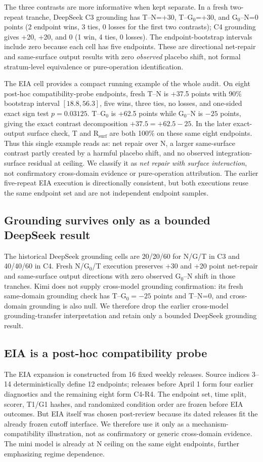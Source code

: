 The three contrasts are more informative when kept separate. In a fresh two-repeat tranche, DeepSeek C3 grounding has T--N=+30, T--G$_0$=+30, and G$_0$--N=0 points (2 endpoint wins, 3 ties, 0 losses for the first two contrasts); C4 grounding gives +20, +20, and 0 (1 win, 4 ties, 0 losses). The endpoint-bootstrap intervals include zero because each cell has five endpoints. These are directional net-repair and same-surface output results with zero \emph{observed} placebo shift, not formal stratum-level equivalence or pure-operation identification.

The EIA cell provides a compact running example of the whole audit. On eight post-hoc compatibility-probe endpoints, fresh T--N is +37.5 points with 90\% bootstrap interval $[18.8,56.3]$, five wins, three ties, no losses, and one-sided exact sign test $p=0.03125$. T--G$_0$ is +62.5 points while G$_0$--N is $-25$ points, giving the exact contrast decomposition $+37.5=+62.5-25$. In the later exact-output surface check, T and R$_{\mathrm{surf}}$ are both 100\% on these same eight endpoints. Thus this single example reads as: net repair over N, a larger same-surface contrast partly created by a harmful placebo shift, and no observed integration-surface residual at ceiling. We classify it as \emph{net repair with surface interaction}, not confirmatory cross-domain evidence or pure-operation attribution. The earlier five-repeat EIA execution is directionally consistent, but both executions reuse the same endpoint set and are not independent endpoint samples.

\subsection{Grounding survives only as a bounded DeepSeek result}
The historical DeepSeek grounding cells are 20/20/60 for N/G/T in C3 and 40/40/60 in C4. Fresh N/G$_0$/T execution preserves +30 and +20 point net-repair and same-surface output directions with zero observed G$_0$--N shift in those tranches. Kimi does not supply cross-model grounding confirmation: its fresh same-domain grounding check has T--G$_0=-25$ points and T--N=0, and cross-domain grounding is also null. We therefore drop the earlier cross-model grounding-transfer interpretation and retain only a bounded DeepSeek grounding result.

\subsection{EIA is a post-hoc compatibility probe}
The EIA expansion is constructed from 16 fixed weekly releases. Source indices 3--14 deterministically define 12 endpoints; releases before April 1 form four earlier diagnostics and the remaining eight form C4-R4. The endpoint set, time split, scorer, T1/G1 hashes, and randomized condition order are frozen before EIA outcomes. But EIA itself was chosen post-review because its dated releases fit the already frozen cutoff interface. We therefore use it only as a mechanism-compatibility illustration, not as confirmatory or generic cross-domain evidence. The mini model is already at N ceiling on the same eight endpoints, further emphasizing regime dependence.

